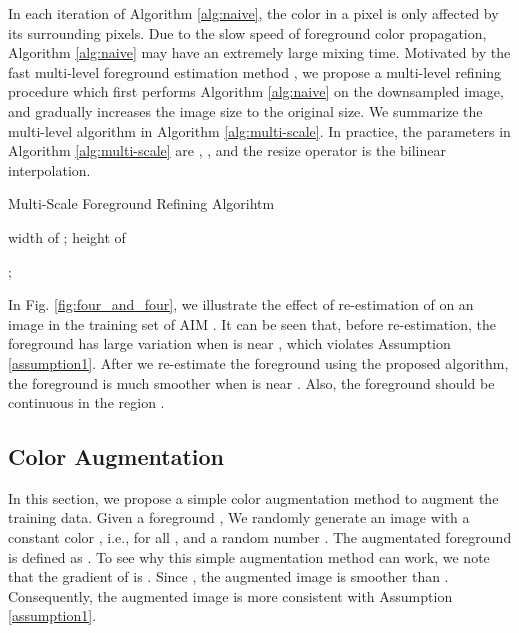 \documentclass{article}
\theoremstyle{plain}
\begin{document}
In each iteration of Algorithm \ref{alg:naive}, the color in a pixel is only affected by its surrounding  pixels.
Due to the slow speed of foreground color propagation,
Algorithm \ref{alg:naive} may 
have an extremely large mixing time.
Motivated by the fast multi-level foreground estimation method \cite{Germer2020FastMulti-Level},
we propose a multi-level refining procedure which first performs Algorithm \ref{alg:naive} on the downsampled image,
and gradually increases the image size to the original size.
We summarize the multi-level algorithm in Algorithm \ref{alg:multi-scale}.
In practice, the parameters in Algorithm \ref{alg:multi-scale} are , ,  and the resize operator is the bilinear interpolation.
\begin{algorithm}[t]
\DontPrintSemicolon
    \SetAlgoNoLine
    \caption{Multi-Scale Foreground Refining Algorihtm}
    \label{alg:multi-scale}
     width of 
    ;
     height of 
    \;
     
    ;
     
    \;
\For{ \KwTo }{
 \Resize{  , ,  }
    \;
     \Resize{  , ,  }
    \;
     \Resize{  , ,  }
    \;
     \Fun{ , , , , }  \;
}
\Return \;
\end{algorithm}





In Fig. \ref{fig:four_and_four}, we illustrate the effect of re-estimation of  on an image in the training set of AIM \cite{Xu2017DeepImageMatting}.
It can be seen that, before re-estimation, the foreground has large variation when  is near , which violates Assumption \ref{assumption1}.
After we re-estimate the foreground using the proposed algorithm, 
the foreground is much smoother when  is near .
Also, the foreground should be continuous in the region .
 




\subsection{Color Augmentation}
In this section, we propose a simple color augmentation method to augment the training data.
Given a foreground , We randomly generate an image  with a constant color , i.e.,  for all , and 
a random number .
The augmentated foreground is defined as .
To see why this simple augmentation method can work, we note that the gradient of  is .
Since , the augmented image  is smoother than .
Consequently, the augmented image is more consistent with Assumption \ref{assumption1}.
\end{document}

